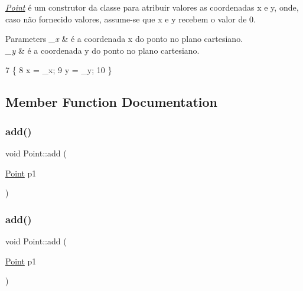 {\itshape \hyperlink{class_point}{Point}} é um construtor da classe para atribuir valores as coordenadas x e y, onde, caso não fornecido valores, assume-\/se que x e y recebem o valor de 0. 


\begin{DoxyParams}{Parameters}
{\em \+\_\+x} & é a coordenada x do ponto no plano cartesiano. \\
\hline
{\em \+\_\+y} & é a coordenada y do ponto no plano cartesiano. \\
\hline
\end{DoxyParams}

\begin{DoxyCode}
7                               \{
8     x = \_x;
9     y = \_y;
10 \}
\end{DoxyCode}


\subsection{Member Function Documentation}
\mbox{\label{class_point_a6bcf8fd2524ecc4d5b6c1dc942d541a5}} 
\subsubsection{\texorpdfstring{add()}{add()}\hspace{0.1cm}{\footnotesize\ttfamily [1/2]}}
{\footnotesize\ttfamily void Point\+::add (\begin{DoxyParamCaption}\item[{\hyperlink{class_point}{Point}}]{p1 }\end{DoxyParamCaption})}

\mbox{\label{class_point_a6bcf8fd2524ecc4d5b6c1dc942d541a5}} 
\subsubsection{\texorpdfstring{add()}{add()}\hspace{0.1cm}{\footnotesize\ttfamily [2/2]}}
{\footnotesize\ttfamily void Point\+::add (\begin{DoxyParamCaption}\item[{\hyperlink{class_point}{Point}}]{p1 }\end{DoxyParamCaption})}



